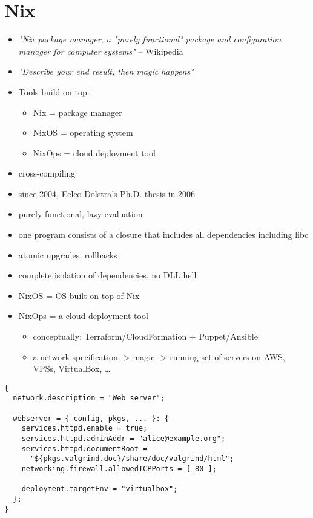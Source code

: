\documentclass[english,odsaz]{fitthesis}
\begin{document}
\section{Nix}
\label{sec:org2d5be15}
\begin{itemize}
\item \emph{"Nix package manager, a "purely functional" package and configuration
manager for computer systems"} -- Wikipedia
\item \emph{"Describe your end result, then magic happens"}
\item Tools build on top:
\begin{itemize}
\item Nix = package manager
\item NixOS = operating system
\item NixOps = cloud deployment tool
\end{itemize}
\item cross-compiling

\item since 2004, Eelco Dolstra's Ph.D. thesis in 2006
\item purely functional, lazy evaluation
\item one program consists of a closure that includes all dependencies including libc
\item atomic upgrades, rollbacks
\item complete isolation of dependencies, no DLL hell
\item NixOS = OS built on top of Nix
\item NixOps = a cloud deployment tool
\begin{itemize}
\item conceptually: Terraform/CloudFormation + Puppet/Ansible
\item a network specification -> magic -> running set of servers on AWS, VPSs,
VirtualBox, \ldots{}
\end{itemize}
\end{itemize}

\begin{verbatim}
{
  network.description = "Web server";

  webserver = { config, pkgs, ... }: {
    services.httpd.enable = true;
    services.httpd.adminAddr = "alice@example.org";
    services.httpd.documentRoot =
      "${pkgs.valgrind.doc}/share/doc/valgrind/html";
    networking.firewall.allowedTCPPorts = [ 80 ];

    deployment.targetEnv = "virtualbox";
  };
}
\end{verbatim}
\end{document}
